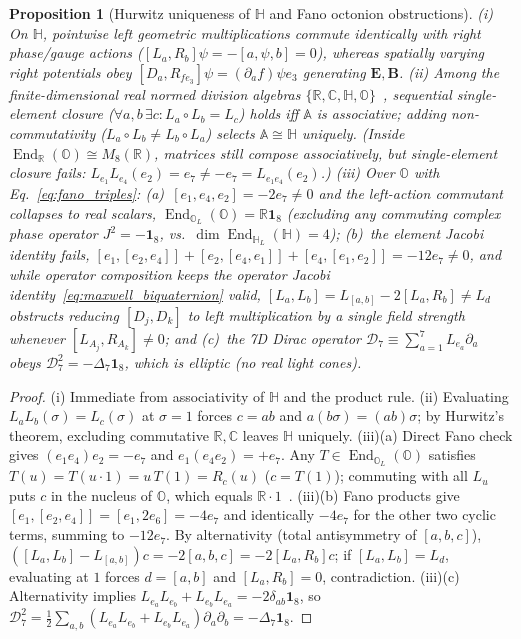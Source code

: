 \documentclass[aps,prd,onecolumn,tightenlines,nofootinbib,notitlepage,10pt,floatfix]{revtex4-2}
\theoremstyle{indentedtheorem}
\newtheorem{proposition}{Proposition}
\begin{document}
\begin{proposition}[Hurwitz uniqueness of $\mathbb{H}$ and Fano octonion obstructions]\label{prop:algebra_uniqueness}
(i) On $\mathbb{H}$, pointwise left geometric multiplications commute identically with right phase/gauge actions ($[L_a,R_b]\psi=-[a,\psi,b]=0$), whereas spatially varying right potentials obey $[D_a,R_{fe_3}]\psi=(\partial_a f)\psi e_3$ generating $\mathbf{E},\mathbf{B}$.
(ii) Among the finite-dimensional real normed division algebras $\{\mathbb{R},\mathbb{C},\mathbb{H},\mathbb{O}\}$~\citep{Hurwitz1898Composition,Baez2002Octonions}, sequential single-element closure ($\forall a,b\,\exists c: L_a\circ L_b=L_c$) holds iff $\mathbb{A}$ is associative; adding non-commutativity ($L_a\circ L_b\neq L_b\circ L_a$) selects $\mathbb{A}\cong\mathbb{H}$ uniquely. (Inside $\operatorname{End}_{\mathbb{R}}(\mathbb{O})\cong M_8(\mathbb{R})$, matrices still compose associatively, but single-element closure fails: $L_{e_1}L_{e_4}(e_2)=e_7\neq -e_7=L_{e_1 e_4}(e_2)$.)
(iii) Over $\mathbb{O}$ with Eq.~\eqref{eq:fano_triples}: (a)~$[e_1,e_4,e_2]=-2e_7\neq 0$ and the left-action commutant collapses to real scalars, $\operatorname{End}_{\mathbb{O}_L}(\mathbb{O})=\mathbb{R}\mathbf{1}_8$ (excluding any commuting complex phase operator $J^2=-\mathbf{1}_8$, vs.\ $\dim\operatorname{End}_{\mathbb{H}_L}(\mathbb{H})=4$); (b)~the element Jacobi identity fails, $[e_1,[e_2,e_4]]+[e_2,[e_4,e_1]]+[e_4,[e_1,e_2]]=-12e_7\neq 0$, and while operator composition keeps the operator Jacobi identity~\eqref{eq:maxwell_biquaternion} valid, $[L_a,L_b]=L_{[a,b]}-2[L_a,R_b]\neq L_d$ obstructs reducing $[D_j,D_k]$ to left multiplication by a single field strength whenever $[L_{A_j},R_{A_k}]\neq 0$; and (c)~the 7D Dirac operator $\mathcal{D}_7\equiv\sum_{a=1}^7 L_{e_a}\partial_a$ obeys $\mathcal{D}_7^2=-\Delta_7\mathbf{1}_8$, which is elliptic (no real light cones).
\end{proposition}
\begin{proof}
(i) Immediate from associativity of $\mathbb{H}$ and the product rule.
(ii) Evaluating $L_a L_b(\sigma)=L_c(\sigma)$ at $\sigma=1$ forces $c=ab$ and $a(b\sigma)=(ab)\sigma$; by Hurwitz's theorem, excluding commutative $\mathbb{R},\mathbb{C}$ leaves $\mathbb{H}$ uniquely.
(iii)(a) Direct Fano check gives $(e_1 e_4)e_2=-e_7$ and $e_1(e_4 e_2)=+e_7$. Any $T\in\operatorname{End}_{\mathbb{O}_L}(\mathbb{O})$ satisfies $T(u)=T(u\cdot 1)=u\,T(1)=R_c(u)$ ($c=T(1)$); commuting with all $L_u$ puts $c$ in the nucleus of $\mathbb{O}$, which equals $\mathbb{R}\cdot 1$~\citep{Baez2002Octonions}.
(iii)(b) Fano products give $[e_1,[e_2,e_4]]=[e_1,2e_6]=-4e_7$ and identically $-4e_7$ for the other two cyclic terms, summing to $-12e_7$. By alternativity (total antisymmetry of $[a,b,c]$), $([L_a,L_b]-L_{[a,b]})c=-2[a,b,c]=-2[L_a,R_b]c$; if $[L_a,L_b]=L_d$, evaluating at $1$ forces $d=[a,b]$ and $[L_a,R_b]=0$, contradiction.
(iii)(c) Alternativity implies $L_{e_a}L_{e_b}+L_{e_b}L_{e_a}=-2\delta_{ab}\mathbf{1}_8$, so $\mathcal{D}_7^2=\tfrac{1}{2}\sum_{a,b}(L_{e_a}L_{e_b}+L_{e_b}L_{e_a})\partial_a\partial_b=-\Delta_7\mathbf{1}_8$.
\end{proof}
\end{document}

